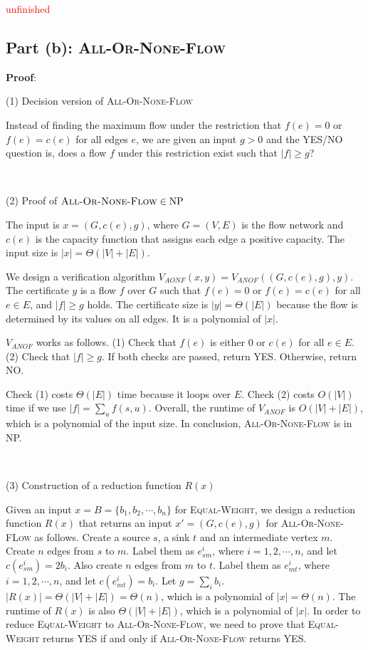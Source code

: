 \documentclass{article}
\begin{document}
\textcolor{red}{unfinished}

\subsection{Part (b): \textsc{All-Or-None-Flow}}
\noindent\textbf{Proof}:

\noindent(1) Decision version of \textsc{All-Or-None-Flow}

Instead of finding the maximum flow under the restriction that $f(e)=0$ or $f(e)=c(e)$ for all edges $e$, we are given an input $g>0$ and the YES/NO question is, does a flow $f$ under this restriction exist such that $|f|\geqslant g$?

~

\noindent(2) Proof of $\textsc{All-Or-None-Flow}\in\textup{NP}$

The input is $x=(G,c(e),g)$, where $G=(V,E)$ is the flow network and $c(e)$ is the capacity function that assigns each edge a positive capacity. The input size is $|x|=\Theta(|V|+|E|)$.

We design a verification algorithm $V_{AONF}(x,y)=V_{ANOF}((G,c(e),g),y)$. The certificate $y$ is a flow $f$ over $G$ such that $f(e)=0$ or $f(e)=c(e)$ for all $e\in E$, and $|f|\geqslant g$ holds. The certificate size is $|y|=\Theta(|E|)$ because the flow is determined by its values on all edges. It is a polynomial of $|x|$.

$V_{ANOF}$ works as follows. (1) Check that $f(e)$ is either 0 or $c(e)$ for all $e\in E$. (2) Check that $|f|\geqslant g$. If both checks are passed, return YES. Otherwise, return NO.

Check (1) costs $\Theta(|E|)$ time because it loops over $E$. Check (2) costs $O(|V|)$ time if we use $|f|=\sum_uf(s,u)$. Overall, the runtime of $V_{ANOF}$ is $O(|V|+|E|)$, which is a polynomial of the input size. In conclusion, \textsc{All-Or-None-Flow} is in NP.

~

\noindent(3) Construction of a reduction function $R(x)$

Given an input $x=B=\{b_1,b_2,\cdots,b_n\}$ for \textsc{Equal-Weight}, we design a reduction function $R(x)$ that returns an input $x'=(G,c(e),g)$ for \textsc{All-Or-None-FLow} as follows. Create a source $s$, a sink $t$ and an intermediate vertex $m$. Create $n$ edges from $s$ to $m$. Label them as $e_{sm}^i$, where $i=1,2,\cdots,n$, and let $c(e_{sm}^i)=2b_i$. Also create $n$ edges from $m$ to $t$. Label them as $e_{mt}^i$, where $i=1,2,\cdots,n$, and let $c(e_{mt}^i)=b_i$. Let $g=\sum_ib_i$. $|R(x)|=\Theta(|V|+|E|)=\Theta(n)$, which is a polynomial of $|x|=\Theta(n)$. The runtime of $R(x)$ is also $\Theta(|V|+|E|)$, which is a polynomial of $|x|$. In order to reduce \textsc{Equal-Weight} to \textsc{All-Or-None-Flow}, we need to prove that \textsc{Equal-Weight} returns YES if and only if \textsc{All-Or-None-Flow} returns YES.
\end{document}
